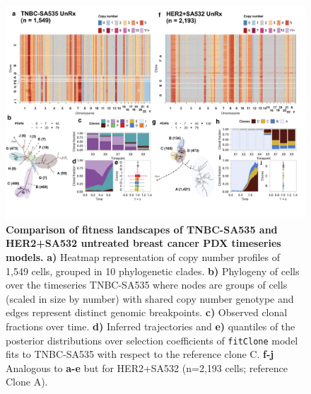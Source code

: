\begin{figure}
\centering
\includegraphics[width=\textwidth]{Figures/chap4/SA535_SA532.png}
	
\caption[Untreated PDX timeseries clonal dynamics at single cell level]
	{\small
	\textbf{Comparison of fitness landscapes of TNBC-SA535 and HER2+SA532 untreated breast cancer PDX timeseries models.}
	    \textbf{a)} Heatmap representation of copy number profiles of 1,549 cells, grouped in 10 phylogenetic clades. \textbf{b)} Phylogeny of cells over the timeseries TNBC-SA535 where nodes are groups of cells (scaled in size by number) with shared copy number genotype and edges represent distinct genomic breakpoints. \textbf{c)} Observed clonal fractions over time. \textbf{d)} Inferred trajectories and \textbf{e)} quantiles of the posterior distributions over selection coefficients of \texttt{fitClone} model fits to TNBC-SA535 with respect to the reference clone C. \textbf{f-j} Analogous to \textbf{a-e} but for HER2+SA532 (n=2,193 cells; reference Clone A).}
\label{fig:SA535heatmapdynamicsHER2}
\end{figure}

